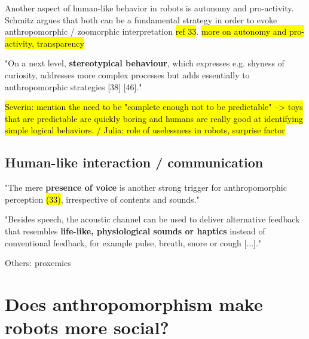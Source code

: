 \documentclass[twocolumn]{svjour3}          %
\begin{document}
	Another aspect of human-like behavior in robots is autonomy and pro-activity. Schmitz argues that both can be a fundamental strategy in order to evoke anthropomorphic / zoomorphic interpretation \cite{schmitz_concepts_2011} \hl{ref 33}. \hl{more on autonomy and pro-activity, transparency}

	"On a next level, \textbf{stereotypical behaviour}, which expresses e.g. shyness of curiosity, addresses more complex processes but adds essentially to anthropomorphic strategies [38] [46]." \cite{schmitz_concepts_2011}
	
	\hl{Severin: mention the need to be "complete enough not to be predictable" --> toys that are predictable are quickly boring and humans are really good at identifying simple logical behaviors. / Julia: role of uselessness in robots, surprise factor}


\subsection{Human-like interaction / communication}
\label{sec:4.3}


	"The mere \textbf{presence of voice} is another strong trigger for anthropomorphic perception \hl{(33)}, irrespective of contents and sounds." \cite{schmitz_concepts_2011}

	"Besides speech, the acoustic channel can be used to deliver alternative feedback that resembles \textbf{life-like, physiological sounds or haptics} instead of conventional feedback, for example pulse, breath, snore or cough [...]." \cite{schmitz_concepts_2011}


Others: proxemics


%
%
%
%
%
%


\section{Does anthropomorphism make robots more social?}
\label{sec:5}
\end{document}
